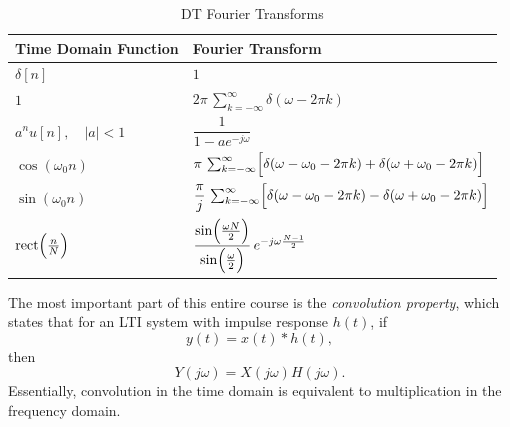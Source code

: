 \begin{table}[ht]
    \centering
    \caption{DT Fourier Transforms}
    \label{tab:dtfourier_transforms}
    \begin{tabular}{ll}
        \toprule
        \textbf{Time Domain Function}          & \textbf{Fourier Transform}                                                                                             \\
        \midrule
        $\delta[n]$                            & $1$                                                                                                                    \\[1mm]
        $1$                                    & $2\pi\,\sum_{k=-\infty}^{\infty}\delta(\omega-2\pi k)$                                                                 \\[1mm]
        $a^n u[n],\quad |a|<1$                 & $\dfrac{1}{1-ae^{-j\omega}}$                                                                                           \\[1mm]
        $\cos(\omega_0 n)$                     & $\pi\,\sum_{k=-\infty}^{\infty}\Bigl[\delta(\omega-\omega_0-2\pi k) + \delta(\omega+\omega_0-2\pi k)\Bigr]$            \\[1mm]
        $\sin(\omega_0 n)$                     & $\dfrac{\pi}{j}\,\sum_{k=-\infty}^{\infty}\Bigl[\delta(\omega-\omega_0-2\pi k) - \delta(\omega+\omega_0-2\pi k)\Bigr]$ \\[1mm]
        $\mathrm{rect}\Bigl(\frac{n}{N}\Bigr)$ & $\dfrac{\sin\Bigl(\frac{\omega N}{2}\Bigr)}{\sin\Bigl(\frac{\omega}{2}\Bigr)}\,e^{-j\omega\frac{N-1}{2}}$              \\
        \bottomrule
    \end{tabular}
\end{table}

The most important part of this entire course is the \emph{convolution property}, which states that
for an LTI system with impulse response $h(t)$, if
\begin{equation}
    y(t) = x(t) * h(t),
\end{equation}
then
\begin{equation}
    Y(j\omega) = X(j\omega)H(j\omega).
\end{equation}
Essentially, convolution in the time domain is equivalent to multiplication in the frequency domain.

